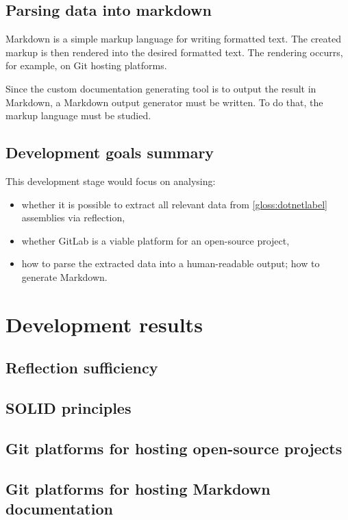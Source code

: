 \subsection{Parsing data into markdown}
Markdown is a simple markup language for writing formatted text. The created markup is then rendered into the desired formatted text. The rendering occurrs, for example, on Git hosting platforms.

Since the custom documentation generating tool is to output the result in Markdown, a Markdown output generator must be written. To do that, the markup language must be studied.

\subsection{Development goals summary}
This development stage would focus on analysing:
\begin{itemize}
    \item whether it is possible to extract all relevant data from \ref{gloss:dotnetlabel} assemblies via reflection,
    \item whether GitLab is a viable platform for an open-source project,
    \item how to parse the extracted data into a human-readable output; how to generate Markdown.
\end{itemize}

\section{Development results}

\subsection{Reflection sufficiency}

\subsection{SOLID principles}

\subsection{Git platforms for hosting open-source projects}

\subsection{Git platforms for hosting Markdown documentation}

